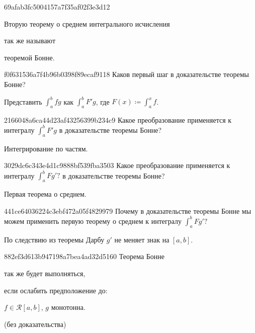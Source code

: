 \begin{note}{69afab3fc5004157a7f35af02f3e3d12}
    \begin{icloze}{2}Вторую теорему о среднем интегрального исчисления\end{icloze} так же называют \begin{icloze}{1}теоремой Бонне.\end{icloze}
\end{note}

\begin{note}{f0f631536a7f4b96b0398f89ecaf9118}
    Каков первый шаг в доказательстве теоремы Бонне?

    \begin{cloze}{1}
        Представить \({ \int_{a}^{b} fg }\) как \({ \int_{a}^{b} F'g }\), где \({ F(x) \coloneqq \int_{a}^{x} f }\).
    \end{cloze}
\end{note}

\begin{note}{2166048a6ca44d23af43256399b234c9}
    Какое преобразование применяется к интегралу \({ \int_{a}^{b} F' g }\) в доказательстве теоремы Бонне?

    \begin{cloze}{1}
        Интегрирование по частям.
    \end{cloze}
\end{note}

\begin{note}{3029dc6c343e4d1c9888bf539fba3503}
    Какое преобразование применяется к интегралу \({ \int_{a}^{b} Fg'? }\) в доказательстве теоремы Бонне?

    \begin{cloze}{1}
        Первая теорема о среднем.
    \end{cloze}
\end{note}

\begin{note}{441ce64036224c3ebf472a05f4829979}
    Почему в доказательстве теоремы Бонне мы можем применить первую теорему о среднем к интегралу \({ \int_{a}^{b} Fg'? }\)

    \begin{cloze}{1}
        По следствию из теоремы Дарбу \({ g' }\) не меняет знак на \({ [a, b] }\).
    \end{cloze}
\end{note}

\begin{note}{882ef3d613b947198a7bea4ad32d5160}
    Теорема Бонне \begin{icloze}{2}так же будет выполняться,\end{icloze} если ослабить предположение до:
    \begin{icloze}{1}
        \begin{center}
            \({ f \in \mathcal R[a, b] }\),\: \({ g }\) монотонна.
        \end{center}
    \end{icloze}

    \begin{center}
        \tiny
        (без доказательства)
    \end{center}
\end{note}

